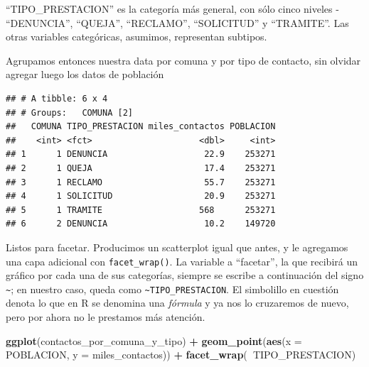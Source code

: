 \documentclass[]{book}
\newenvironment{Shaded}{\begin{snugshade}}{\end{snugshade}}
\newcommand{\KeywordTok}[1]{\textcolor[rgb]{0.13,0.29,0.53}{\textbf{#1}}}
\newcommand{\DataTypeTok}[1]{\textcolor[rgb]{0.13,0.29,0.53}{#1}}
\newcommand{\DecValTok}[1]{\textcolor[rgb]{0.00,0.00,0.81}{#1}}
\newcommand{\StringTok}[1]{\textcolor[rgb]{0.31,0.60,0.02}{#1}}
\newcommand{\OperatorTok}[1]{\textcolor[rgb]{0.81,0.36,0.00}{\textbf{#1}}}
\newcommand{\NormalTok}[1]{#1}
\begin{document}
``TIPO\_PRESTACION'' es la categoría más general, con sólo cinco niveles
- ``DENUNCIA'', ``QUEJA'', ``RECLAMO'', ``SOLICITUD'' y ``TRAMITE''. Las
otras variables categóricas, asumimos, representan subtipos.

Agrupamos entonces nuestra data por comuna y por tipo de contacto, sin
olvidar agregar luego los datos de población

\begin{Shaded}
\end{Shaded}

\begin{verbatim}
## # A tibble: 6 x 4
## # Groups:   COMUNA [2]
##   COMUNA TIPO_PRESTACION miles_contactos POBLACION
##    <int> <fct>                     <dbl>     <int>
## 1      1 DENUNCIA                   22.9    253271
## 2      1 QUEJA                      17.4    253271
## 3      1 RECLAMO                    55.7    253271
## 4      1 SOLICITUD                  20.9    253271
## 5      1 TRAMITE                   568      253271
## 6      2 DENUNCIA                   10.2    149720
\end{verbatim}

Listos para facetar. Producimos un scatterplot igual que antes, y le
agregamos una capa adicional con \texttt{facet\_wrap()}. La variable a
``facetar'', la que recibirá un gráfico por cada una de sus categorías,
siempre se escribe a continuación del signo \texttt{\textasciitilde{}};
en nuestro caso, queda como \texttt{\textasciitilde{}TIPO\_PRESTACION}.
El simbolillo en cuestión denota lo que en R se denomina una
\emph{fórmula} y ya nos lo cruzaremos de nuevo, pero por ahora no le
prestamos más atención.

\begin{Shaded}
\begin{Highlighting}[]
\KeywordTok{ggplot}\NormalTok{(contactos_por_comuna_y_tipo) }\OperatorTok{+}\StringTok{ }
\StringTok{    }\KeywordTok{geom_point}\NormalTok{(}\KeywordTok{aes}\NormalTok{(}\DataTypeTok{x =}\NormalTok{ POBLACION, }\DataTypeTok{y =}\NormalTok{ miles_contactos)) }\OperatorTok{+}
\StringTok{    }\KeywordTok{facet_wrap}\NormalTok{(}\OperatorTok{~}\NormalTok{TIPO_PRESTACION)}
\end{Highlighting}
\end{Shaded}
\end{document}
